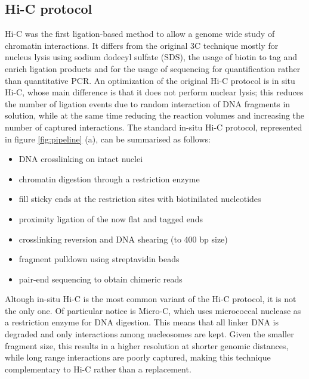 \subsection{Hi-C protocol}
Hi-C was the first ligation-based method to allow a genome wide study of chromatin interactions. It differs from the original 3C technique mostly for nucleus lysis using sodium dodecyl sulfate (SDS), the usage of biotin to tag and enrich ligation products and for the usage of sequencing for quantification rather than quantitative PCR\cite{hicoriginal2009}. An optimization of the original Hi-C protocol is in situ Hi-C, whose main difference is that it does not perform nuclear lysis; this reduces the number of ligation events due to random interaction of DNA fragments in solution, while at the same time reducing the reaction volumes and increasing the number of captured interactions\cite{insituhic2014}. The standard in-situ Hi-C protocol, represented in figure \ref{fig:pipeline} (a), can be summarised as follows:

\begin{itemize}\tightlist
  \item DNA crosslinking on intact nuclei
  \item chromatin digestion through a restriction enzyme
  \item fill sticky ends at the restriction sites with biotinilated nucleotides
  \item proximity ligation of the now flat and tagged ends
  \item crosslinking reversion and DNA shearing (to 400 bp size)
  \item fragment pulldown using streptavidin beads
  \item pair-end sequencing to obtain chimeric reads
\end{itemize}
 
Altough in-situ Hi-C is the most common variant of the Hi-C protocol, it is not the only one. Of particular notice is Micro-C, which uses micrococcal nuclease as a restriction enzyme for DNA digestion. This means that all linker DNA is degraded and only interactions among nucleosomes are kept. Given the smaller fragment size, this results in a higher resolution at shorter genomic distances, while long range interactions are poorly captured, making this technique complementary to Hi-C rather than a replacement\cite{microc2015}.

